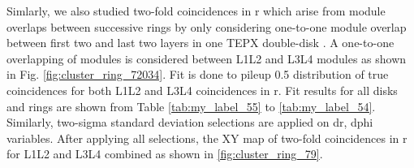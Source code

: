 
\newpage

Simlarly, we also studied two-fold coincidences in r which arise from module overlaps between successive rings by only considering one-to-one module overlap between first two and last two layers in one TEPX double-disk \cite{BRIL2021}.  %
 A one-to-one overlapping of modules is considered between L1L2 and L3L4 modules as shown in Fig. \ref{fig:cluster_ring_72034}. %
 Fit is done to pileup 0.5 distribution of true coincidences for both L1L2 and L3L4 coincidences in r. %
  Fit results for all disks and rings are shown from  Table \ref{tab:my_label_55} to \ref{tab:my_label_54}. Similarly, two-sigma standard deviation selections are applied on dr, dphi variables. After applying all selections, the XY map of two-fold coincidences in r for L1L2 and L3L4 combined as shown in \ref{fig:cluster_ring_79}.

